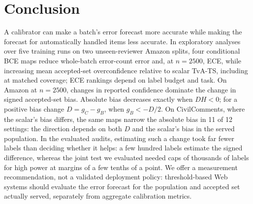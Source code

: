 \documentclass[sigconf,anonymous,review]{acmart}
\begin{document}
\section{Conclusion}
A calibrator can make a batch's error forecast more accurate while
making the forecast for automatically handled items less accurate. In exploratory analyses over five training runs on two unseen-reviewer
Amazon splits, four conditional BCE maps reduce whole-batch error-count
error and, at $n{=}2500$, ECE, while increasing mean accepted-set
overconfidence relative to scalar TvA-TS, including at matched coverage;
ECE rankings depend on label budget and task. On Amazon at $n{=}2500$, changes in reported confidence dominate the
change in signed accepted-set bias. Absolute bias decreases
exactly when $DH<0$; for a positive bias change $D=g_C-g_B$, when
$g_B<-D/2$. On
CivilComments, where the scalar's bias differs, the same maps narrow the absolute bias in
11 of 12 settings: the direction depends on both $D$ and the scalar's bias in the
served population. In the evaluated audits, estimating such a change took far fewer labels
than deciding whether it helps: a few hundred labels estimate the signed
difference, whereas the joint test we evaluated needed caps of thousands
of labels for high power at margins of a few tenths of a point. We
offer a measurement recommendation, not a validated
deployment policy: threshold-based Web systems should
evaluate the error forecast for the population and accepted set actually
served, separately from aggregate calibration metrics.




\appendix
\end{document}
